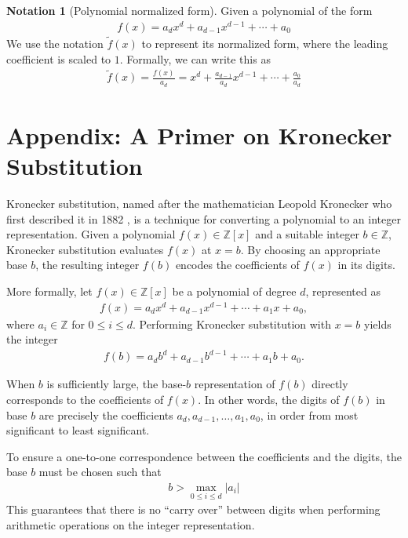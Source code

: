 \documentclass[12pt,reqno]{article}
\theoremstyle{plain}
\theoremstyle{definition}
\newtheorem{notation}{Notation}
\begin{document}
\begin{notation}[Polynomial normalized form]

Given a polynomial of the form
\begin{align*}
f(x) = a_d x^d + a_{d-1} x^{d-1} + \cdots + a_0
\end{align*}
We use the notation $\tilde{f}(x)$ to represent its normalized form, where the leading coefficient is scaled to $1$. Formally, we can write this as
\begin{align*}
    \tilde{f}(x) = \frac{f(x)}{a_d} = x^d + \frac{a_{d-1}}{a_d} x^{d-1} + \cdots + \frac{a_0}{a_d}
\end{align*}
\end{notation}

\section{Appendix: A Primer on Kronecker Substitution} \label{section:kronecker}
Kronecker substitution, named after the mathematician Leopold Kronecker who first described it in 1882 \cite{kronecker1882}, is a technique for converting a polynomial to an integer representation. Given a polynomial $f(x) \in \mathbb{Z}[x]$ and a suitable integer $b \in \mathbb{Z}$, Kronecker substitution evaluates $f(x)$ at $x = b$. By choosing an appropriate base $b$, the resulting integer $f(b)$ encodes the coefficients of $f(x)$ in its digits.

More formally, let $f(x) \in \mathbb{Z}[x]$ be a polynomial of degree $d$, represented as
\begin{align*}
f(x) = a_d x^d + a_{d-1} x^{d-1} + \cdots + a_1 x + a_0,
\end{align*}
where $a_i \in \mathbb{Z}$ for $0 \leq i \leq d$. Performing Kronecker substitution with $x = b$ yields the integer
\begin{align*}
f(b) = a_d b^d + a_{d-1} b^{d-1} + \cdots + a_1 b + a_0.
\end{align*}

When $b$ is sufficiently large, the base-$b$ representation of $f(b)$ directly corresponds to the coefficients of $f(x)$. In other words, the digits of $f(b)$ in base $b$ are precisely the coefficients $a_d, a_{d-1}, \ldots, a_1, a_0$, in order from most significant to least significant.

To ensure a one-to-one correspondence between the coefficients and the digits, the base $b$ must be chosen such that
\begin{align*}
    b > \max_{0 \leq i \leq d} |a_i|
\end{align*}
This guarantees that there is no ``carry over'' between digits when performing arithmetic operations on the integer representation.
\end{document}
